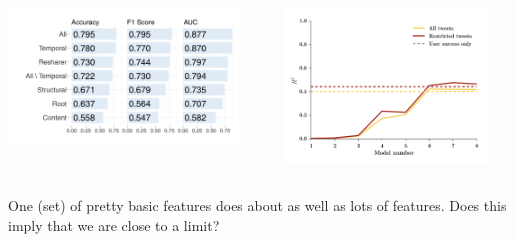 \documentclass[aspectratio=169]{beamer}
\begin{document}
\begin{frame}

\begin{columns}[c]
  \begin{center}
    \includegraphics[width = 0.9\textwidth]{figures/cheng_can_2014_fig4}
   \end{center}
     \pause
   \begin{center}
     \includegraphics[width = 0.9\textwidth]{figures/martin_exploring_2016_fig4}
    \end{center}
\end{columns}

One (set) of pretty basic features does about as well as lots of features.  Does this imply that we are close to a limit?

\end{frame}
\end{document}

